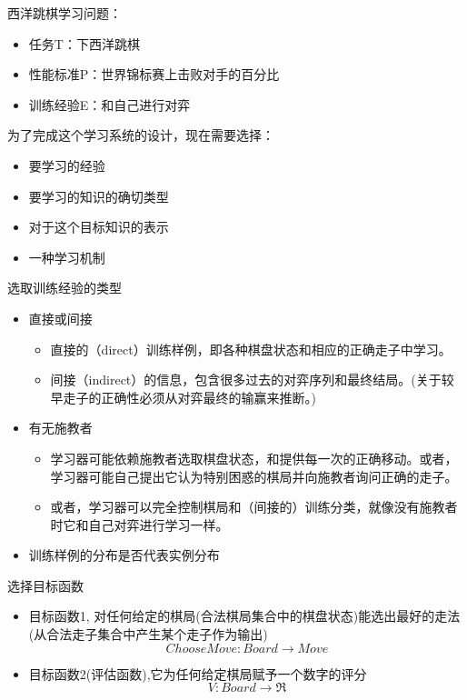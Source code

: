 \documentclass[aspectratio=169]{beamer}
\begin{document}
\begin{frame}[label={sec:orgc1943ac}]{西洋跳棋学习问题：}
\begin{itemize}
\item 任务T：下西洋跳棋
\item 性能标准P：世界锦标赛上击败对手的百分比
\item 训练经验E：和自己进行对弈
\end{itemize}

为了完成这个学习系统的设计，现在需要选择：
\begin{itemize}
\item 要学习的经验
\item 要学习的知识的确切类型
\item 对于这个目标知识的表示
\item 一种学习机制
\end{itemize}
\end{frame}
\begin{frame}[label={sec:orgd45e38e}]{选取训练经验的类型}
\begin{itemize}
\item 直接或间接
\begin{itemize}
\item 直接的（direct）训练样例，即各种棋盘状态和相应的正确走子中学习。
\item 间接（indirect）的信息，包含很多过去的对弈序列和最终结局。(关于较早走子的正确性必须从对弈最终的输赢来推断。)
\end{itemize}
\item 有无施教者
\begin{itemize}
\item 学习器可能依赖施教者选取棋盘状态，和提供每一次的正确移动。或者，学习器可能自己提出它认为特别困惑的棋局并向施教者询问正确的走子。
\item 或者，学习器可以完全控制棋局和（间接的）训练分类，就像没有施教者时它和自己对弈进行学习一样。
\end{itemize}

\item 训练样例的分布是否代表实例分布
\end{itemize}
\end{frame}
\begin{frame}[label={sec:orgc559305}]{选择目标函数}
\begin{itemize}
\item 目标函数1, 对任何给定的棋局(合法棋局集合中的棋盘状态)能选出最好的走法(从合法走子集合中产生某个走子作为输出)
$$ChooseMove: Board \rightarrow Move$$
\item 目标函数2(评估函数),它为任何给定棋局赋予一个数字的评分
$$V: Board \rightarrow \Re$$
\end{itemize}
\end{frame}
\end{document}

